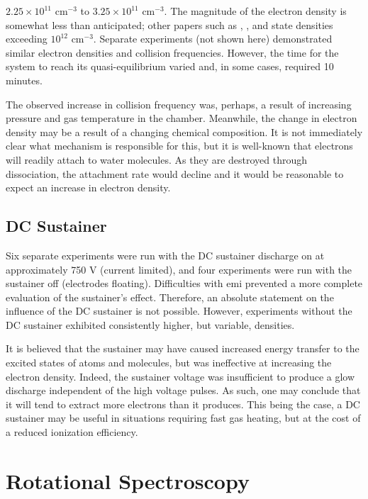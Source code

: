 $2.25\times 10^{11}$ cm$^{-3}$ to $3.25\times 10^{11}$ cm$^{-3}$. The magnitude
of the electron density is somewhat less than anticipated; other papers such as
\cite{Aleksandrov2007}, \cite{Pancheshnyi1999}, and \cite{Macheret2006} state
densities exceeding $10^{12}$ cm$^{-3}$. Separate experiments (not shown here)
demonstrated similar electron densities and collision frequencies. However, the
time for the system to reach its quasi-equilibrium varied and, in some cases,
required 10 minutes.

The observed increase in collision frequency was, perhaps, a result of
increasing pressure and gas temperature in the chamber. Meanwhile, the change in
electron density may be a result of a changing chemical composition. It is not
immediately clear what mechanism is responsible for this, but it is well-known
that electrons will readily attach to water molecules. As they are destroyed
through dissociation, the attachment rate would decline and it would be
reasonable to expect an increase in electron density.

\subsection{DC Sustainer}

Six separate experiments were run with the DC sustainer discharge on at
approximately 750 V (current limited), and four experiments were run with the
sustainer off (electrodes floating). Difficulties with \acs{emi} prevented a
more complete evaluation of the sustainer's effect. Therefore, an absolute
statement on the influence of the DC sustainer is not possible. However,
experiments without the DC sustainer exhibited consistently higher, but
variable, densities.

It is believed that the sustainer may have caused increased energy transfer to
the excited states of atoms and molecules, but was ineffective at increasing the
electron density. Indeed, the sustainer voltage was insufficient to produce a
glow discharge independent of the high voltage pulses. As such, one may conclude
that it will tend to extract more electrons than it produces. This being the
case, a DC sustainer may be useful in situations requiring fast gas heating, but
at the cost of a reduced ionization efficiency.

\section{Rotational Spectroscopy}

